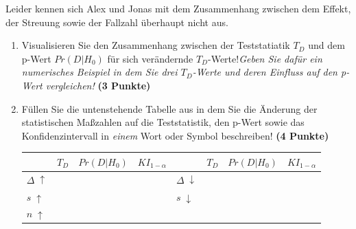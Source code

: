 \documentclass[a4paper, 9pt]{scrartcl}\usepackage[]{graphicx}\usepackage[]{xcolor}
\begin{document}
\vspace{1ex}

Leider kennen sich Alex und Jonas mit dem Zusammenhang zwischen dem Effekt, der Streuung sowie der Fallzahl überhaupt nicht aus. 


\begin{enumerate}
\item Visualisieren Sie den Zusammenhang zwischen der Teststatiatik $T_{D}$ und dem p-Wert $Pr(D|H_0)$ für sich verändernde $T_{D}$-Werte!\textit{Geben Sie dafür ein numerisches Beispiel in dem Sie drei $T_{D}$-Werte und deren Einfluss auf den p-Wert vergleichen!} \textbf{(3 Punkte)}  
\item  Füllen Sie die untenstehende Tabelle aus in dem Sie die Änderung der statistischen Maßzahlen auf die Teststatistik, den p-Wert sowie das Konfidenzintervall in \textit{einem} Wort oder Symbol beschreiben! \textbf{(4 Punkte)}
\begin{center}
  \large
  \begin{tabular}[c]{l|c|c|c|l|c|c|c}
    & $T_{D}$ & $Pr(D|H_0)$ & $KI_{1-\alpha}$ & & $T_{D}$ & $Pr(D|H_0)$ & $KI_{1-\alpha}$\strut\\ 
    \hline
    \textbf{$\Delta\; \uparrow$} & \hspace{1.8cm} & \hspace{1.8cm}  & \hspace{1.8cm} & \textbf{
                                                          $\Delta\; \downarrow$} &
                                                                          \hspace{1.8cm} & \hspace{1.8cm}  & \hspace{1.8cm}\strut\\
    \hline
        \textbf{$s\; \uparrow$} & \hspace{1.8cm} & \hspace{1.8cm}  & \hspace{1.8cm} & \textbf{
                                                          $s\; \downarrow$} &
                                                                          \hspace{1.8cm}
                                                & \hspace{1.8cm}  & \hspace{1.8cm}\strut\\
    \hline
        \textbf{$n\; \uparrow$} & \hspace{1.8cm} & \hspace{1.8cm}  & \hspace{1.8cm} & \textbf{
}
\end{tabular}
\end{center}
\end{enumerate}
\end{document}
